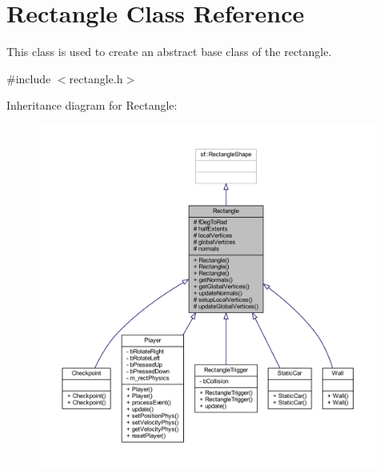 \hypertarget{class_rectangle}{}\section{Rectangle Class Reference}
\label{class_rectangle}


This class is used to create an abstract base class of the rectangle.  




{\ttfamily \#include $<$rectangle.\+h$>$}



Inheritance diagram for Rectangle\+:\nopagebreak
\begin{figure}[H]
\begin{center}
\leavevmode
\includegraphics[width=350pt]{class_rectangle__inherit__graph}
\end{center}
\end{figure}


